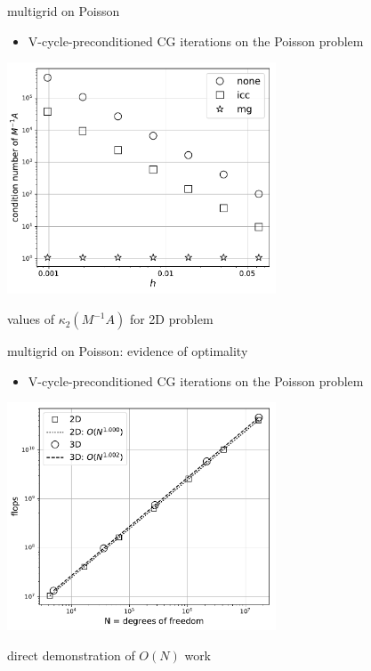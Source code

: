 \documentclass[hide notes,intlimits,usenames,dvipsnames]{beamer}
\begin{document}
\begin{frame}{multigrid on Poisson}
\begin{itemize}
\item V-cycle-preconditioned CG iterations on the Poisson problem
\end{itemize}

\begin{center}
\includegraphics[width=0.6\textwidth]{figs/pccondition}

\small values of $\kappa_2(M^{-1}A)$ for 2D problem
\end{center}
\end{frame}


\begin{frame}{multigrid on Poisson: evidence of optimality}
\begin{itemize}
\item V-cycle-preconditioned CG iterations on the Poisson problem
\end{itemize}

\begin{center}
\includegraphics[width=0.6\textwidth]{figs/optimal-flops}

\small direct demonstration of $O(N)$ work
\end{center}
\end{frame}
\end{document}

